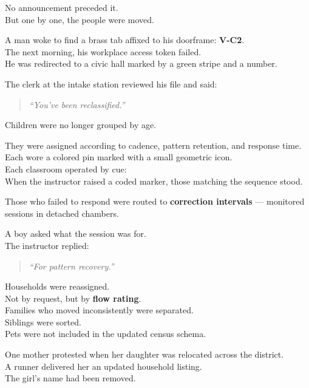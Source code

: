 \documentclass[12pt]{article}
\begin{document}
No announcement preceded it.\\
But one by one, the people were moved.

A man woke to find a brass tab affixed to his doorframe: \textbf{V-C2}.\\
The next morning, his workplace access token failed.\\
He was redirected to a civic hall marked by a green stripe and a number.

The clerk at the intake station reviewed his file and said:

\begin{quote}
\textit{“You’ve been reclassified.”}
\end{quote}

\vspace{1em}

Children were no longer grouped by age.

They were assigned according to cadence, pattern retention, and response time.\\
Each wore a colored pin marked with a small geometric icon.\\
Each classroom operated by cue:\\
When the instructor raised a coded marker, those matching the sequence stood.

Those who failed to respond were routed to \textbf{correction intervals} — monitored sessions in detached chambers.

A boy asked what the session was for.\\
The instructor replied:

\begin{quote}
\textit{“For pattern recovery.”}
\end{quote}

\vspace{1em}

Households were reassigned.\\
Not by request, but by \textbf{flow rating}.\\
Families who moved inconsistently were separated.\\
Siblings were sorted.\\
Pets were not included in the updated census schema.

One mother protested when her daughter was relocated across the district.\\
A runner delivered her an updated household listing.\\
The girl’s name had been removed.
\end{document}

